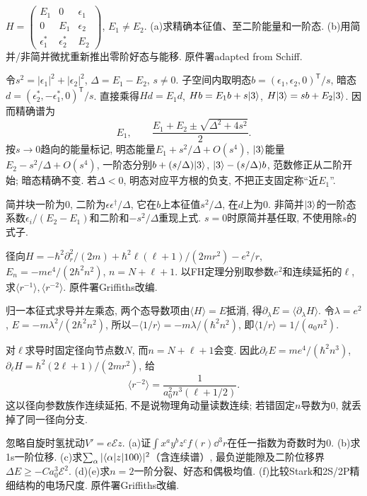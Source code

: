 \begin{exercise}
$H=\begin{pmatrix}E_1&0&\epsilon_1\\0&E_1&\epsilon_2\\\epsilon_1^*&\epsilon_2^*&E_2\end{pmatrix}$, $E_1\ne E_2$. (a)求精确本征值、至二阶能量和一阶态. (b)用简并/非简并微扰重新推出零阶好态与能移. 原件署adapted from Schiff.
\end{exercise}
\begin{solution}
令$s^2=|\epsilon_1|^2+|\epsilon_2|^2$, $\Delta=E_1-E_2$, $s\ne0$. 子空间内取明态$b=(\epsilon_1,\epsilon_2,0)^{\mathsf T}/s$, 暗态$d=(\epsilon_2^*,-\epsilon_1^*,0)^{\mathsf T}/s$. 直接乘得$Hd=E_1d$, $Hb=E_1b+s\lvert 3\rangle$, $H\lvert 3\rangle=sb+E_2\lvert 3\rangle$. 因而精确谱为
\[
E_1,\qquad \frac{E_1+E_2\pm\sqrt{\Delta^2+4s^2}}2.
\]
按$s\to0$趋向的能量标记, 明态能量$E_1+s^2/\Delta+O(s^4)$, $\lvert 3\rangle$能量$E_2-s^2/\Delta+O(s^4)$, 一阶态分别$b+(s/\Delta)\lvert 3\rangle$, $\lvert 3\rangle-(s/\Delta)b$, 范数修正从二阶开始; 暗态精确不变. 若$\Delta<0$, 明态对应平方根的负支, 不把正支固定称“近$E_1$”.

简并块一阶为0, 二阶为$\epsilon\epsilon^\dagger/\Delta$, 它在$b$上本征值$s^2/\Delta$, 在$d$上为0. 非简并$\lvert 3\rangle$的一阶态系数$\epsilon_i/(E_2-E_1)$和二阶和$-s^2/\Delta$重现上式. $s=0$时原简并基任取, 不使用除$s$的式子.
\end{solution}
\begin{exercise}
径向$H=-\hbar^2\partial_r^2/(2m)+\hbar^2\ell(\ell+1)/(2mr^2)-e^2/r$, $E_n=-me^4/(2\hbar^2n^2)$, $n=N+\ell+1$. 以FH定理分别取参数$e^2$和连续延拓的$\ell$, 求$\langle r^{-1}\rangle,\langle r^{-2}\rangle$. 原件署Griffiths改编.
\end{exercise}
\begin{solution}
归一本征式求导并左乘态, 两个态导数项由$\langle H\rangle=E$抵消, 得$\partial_\lambda E=\langle\partial_\lambda H\rangle$. 令$\lambda=e^2$, $E=-m\lambda^2/(2\hbar^2n^2)$, 所以$-\langle1/r\rangle=-m\lambda/(\hbar^2n^2)$, 即$\langle1/r\rangle=1/(a_0n^2)$.

对$\ell$求导时固定径向节点数$N$, 而$n=N+\ell+1$会变. 因此$\partial_\ell E=me^4/(\hbar^2n^3)$, $\partial_\ell H=\hbar^2(2\ell+1)/(2mr^2)$, 给
\[
\langle r^{-2}\rangle=\frac1{a_0^2n^3(\ell+1/2)}.
\]
这以径向参数族作连续延拓, 不是说物理角动量读数连续; 若错固定$n$导数为0, 就丢掉了同一径向分支.
\end{solution}
\begin{exercise}
忽略自旋时氢扰动$V'=e\mathcal E z$. (a)证$\int x^ay^bz^cf(r)\dd^3r$在任一指数为奇数时为0. (b)求1s一阶位移. (c)求$\sum_\alpha|\langle \alpha\rvert z\lvert 100\rangle|^2$（含连续谱）, 最负逆能隙及二阶位移界$\Delta E\ge-Ca_0^3\mathcal E^2$. (d)(e)求$n=2$一阶分裂、好态和偶极均值. (f)比较Stark和2S/2P精细结构的电场尺度. 原件署Griffiths改编.
\end{exercise}
